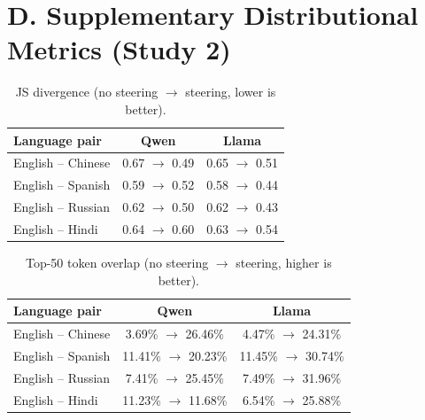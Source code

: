\section*{D. Supplementary Distributional Metrics (Study 2)}

\begin{table}[h]
\centering
\caption{JS divergence (no steering $\rightarrow$ steering, lower is better).}
\begin{tabular}{lcc}
\toprule
Language pair & Qwen & Llama \\
\midrule
English -- Chinese & 0.67 $\rightarrow$ 0.49 & 0.65 $\rightarrow$ 0.51 \\
English -- Spanish & 0.59 $\rightarrow$ 0.52 & 0.58 $\rightarrow$ 0.44 \\
English -- Russian & 0.62 $\rightarrow$ 0.50 & 0.62 $\rightarrow$ 0.43 \\
English -- Hindi & 0.64 $\rightarrow$ 0.60 & 0.63 $\rightarrow$ 0.54 \\
\bottomrule
\end{tabular}
\label{tab:appendix_js}
\end{table}

\begin{table}[h]
\centering
\caption{Top-50 token overlap (no steering $\rightarrow$ steering, higher is better).}
\begin{tabular}{lcc}
\toprule
Language pair & Qwen & Llama \\
\midrule
English -- Chinese & 3.69\% $\rightarrow$ 26.46\% & 4.47\% $\rightarrow$ 24.31\% \\
English -- Spanish & 11.41\% $\rightarrow$ 20.23\% & 11.45\% $\rightarrow$ 30.74\% \\
English -- Russian & 7.41\% $\rightarrow$ 25.45\% & 7.49\% $\rightarrow$ 31.96\% \\
English -- Hindi & 11.23\% $\rightarrow$ 11.68\% & 6.54\% $\rightarrow$ 25.88\% \\
\bottomrule
\end{tabular}
\label{tab:appendix_overlap}
\end{table}
